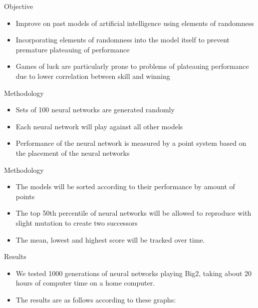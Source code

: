 \documentclass{beamer}
\begin{document}
\begin{frame}{Objective}
	
	\begin{itemize}
		
		\item Improve on past models of artificial intelligence using elements of randomness
		\item Incorporating elements of randomness into the model itself to prevent premature plateauing of performance
		\item Games of luck are particularly prone to problems of plateauing performance due to lower correlation between skill and winning
		
	\end{itemize}
	
\end{frame}


\begin{frame}{Methodology}
	
	\begin{itemize}
	
		\item Sets of 100 neural networks are generated randomly
		\item Each neural network will play against all other models
		\item Performance of the neural network is measured by a point system based on the placement of the neural networks
		
	\end{itemize}
	
\end{frame}

\begin{frame}{Methodology}
	
	\begin{itemize}
		
		\item The models will be sorted according to their performance by amount of points
		\item The top 50th percentile of neural networks will be allowed to reproduce with slight mutation to create two successors
		\item The mean, lowest and highest score will be tracked over time.
		
	\end{itemize}
	
\end{frame}

\begin{frame}{Results}
	
	\begin{itemize}
		\item We tested 1000 generations of neural networks playing Big2, taking about 20 hours of computer time on a home computer.
		\item The results are as follows according to these graphs:
	\end{itemize}
	
\end{frame}
\end{document}
